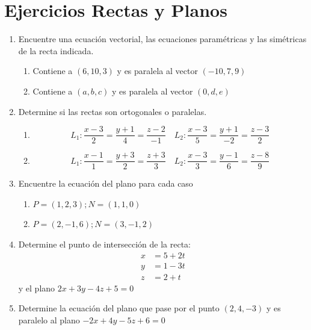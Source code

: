 \documentclass[12pt,letterpaper]{article}
\begin{document}
\section*{Ejercicios Rectas y Planos}
\begin{enumerate}
    \item Encuentre una ecuación vectorial, las ecuaciones paramétricas y las simétricas de la recta indicada.
    \begin{enumerate}
        \item Contiene a $(6,10,3)$ y es paralela al vector $(-10,7,9)$
        \item Contiene a $(a,b,c)$ y es paralela al vector $(0,d,e)$
    \end{enumerate}
    \item Determine si las rectas son ortogonales o paralelas.
    \begin{enumerate}
        \item \[
L_1:\displaystyle \frac{x - 3}{2} = \frac{y + 1}{4} = \frac{z - 2}{-1}
\quad
L_2:\displaystyle \frac{x - 3}{5} = \frac{y + 1}{-2} = \frac{z - 3}{2}
\]
        \item \[
L_1:\displaystyle \frac{x - 1}{1} = \frac{y + 3}{2} = \frac{z + 3}{3}
\quad
L_2:\displaystyle \frac{x - 3}{3} = \frac{y - 1}{6} = \frac{z - 8}{9}
\]
    \end{enumerate}
    \item Encuentre la ecuación del plano para cada caso
    \begin{enumerate}
        \item $P=(1,2,3); N=(1,1,0)$
        \item $P=(2,-1,6); N=(3,-1,2)$
    \end{enumerate}
    \item Determine el punto de intersección de la recta: \[
\begin{aligned}
x &= 5 + 2t \\
y &= 1 - 3t \\
z &= 2 + t
\end{aligned}
\] y el plano $2x+3y-4z+5=0$
    \item Determine la ecuación del plano que pase por el punto $(2,4,-3)$ y es paralelo al plano $-2x+4y-5z+6=0$
\end{enumerate}

\newpage
\end{document}
